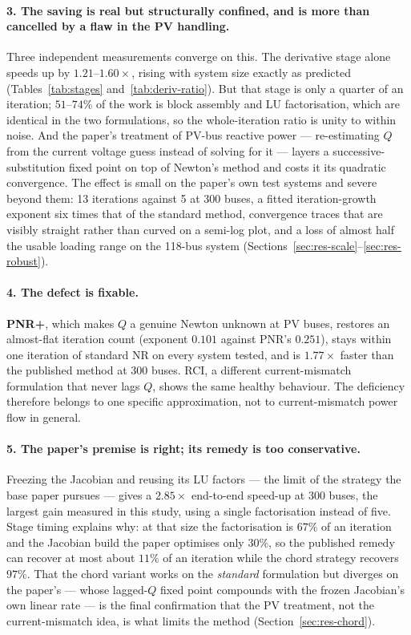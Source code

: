 \documentclass[sigconf,nonacm]{acmart}
\begin{document}
\paragraph{3. The saving is real but structurally confined, and is more than
cancelled by a flaw in the PV handling.}
Three independent measurements converge on this. The derivative stage alone
speeds up by $1.21$--$1.60\times$, rising with system size exactly as predicted
(Tables~\ref{tab:stages} and~\ref{tab:deriv-ratio}). But that stage is only a
quarter of an iteration; $51$--$74\%$ of the work is block assembly and LU
factorisation, which are identical in the two formulations, so the
whole-iteration ratio is unity to within noise. And the paper's treatment of
PV-bus reactive power --- re-estimating $Q$ from the current voltage guess
instead of solving for it --- layers a successive-substitution fixed point on
top of Newton's method and costs it its quadratic convergence. The effect is
small on the paper's own test systems and severe beyond them: 13 iterations
against 5 at 300 buses, a fitted iteration-growth exponent six times that of the
standard method, convergence traces that are visibly straight rather than curved
on a semi-log plot, and a loss of almost half the usable loading range on the
118-bus system (Sections~\ref{sec:res-scale}--\ref{sec:res-robust}).

\paragraph{4. The defect is fixable.}
\textbf{PNR+}, which makes $Q$ a genuine Newton unknown at PV buses, restores an
almost-flat iteration count (exponent $0.101$ against PNR's $0.251$), stays
within one iteration of standard NR on every system tested, and is
$1.77\times$ faster than the published method at 300 buses. RCI, a different
current-mismatch formulation that never lags $Q$, shows the same healthy
behaviour. The deficiency therefore belongs to one specific approximation, not
to current-mismatch power flow in general.

\paragraph{5. The paper's premise is right; its remedy is too conservative.}
Freezing the Jacobian and reusing its LU factors --- the limit of the strategy
the base paper pursues --- gives a $2.85\times$ end-to-end speed-up at 300 buses,
the largest gain measured in this study, using a single factorisation instead of
five. Stage timing explains why: at that size the factorisation is $67\%$ of an
iteration and the Jacobian build the paper optimises only $30\%$, so the
published remedy can recover at most about $11\%$ of an iteration while the
chord strategy recovers $97\%$. That the chord variant works on the
\emph{standard} formulation but diverges on the paper's --- whose lagged-$Q$
fixed point compounds with the frozen Jacobian's own linear rate --- is the final
confirmation that the PV treatment, not the current-mismatch idea, is what
limits the method (Section~\ref{sec:res-chord}).
\end{document}

